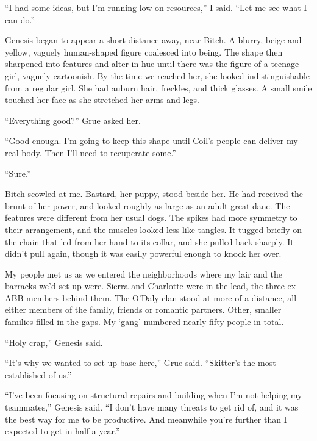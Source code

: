 ``I had some ideas, but I'm running low on resources,'' I said.  ``Let me see what I can do.''



Genesis began to appear a short distance away, near Bitch.  A blurry, beige and yellow, vaguely human-shaped figure coalesced into being.  The shape then sharpened into features and alter in hue until there was the figure of a teenage girl, vaguely cartoonish.  By the time we reached her, she looked indistinguishable from a regular girl.  She had auburn hair, freckles, and thick glasses.  A small smile touched her face as she stretched her arms and legs.



``Everything good?'' Grue asked her.



``Good enough.  I'm going to keep this shape until Coil's people can deliver my real body.  Then I'll need to recuperate some.''



``Sure.''



Bitch scowled at me.  Bastard, her puppy, stood beside her.  He had received the brunt of her power, and looked roughly as large as an adult great dane.  The features were different from her usual dogs.  The spikes had more symmetry to their arrangement, and the muscles looked less like tangles.  It tugged briefly on the chain that led from her hand to its collar, and she pulled back sharply.  It didn't pull again, though it was easily powerful enough to knock her over.



My people met us as we entered the neighborhoods where my lair and the barracks we'd set up were.  Sierra and Charlotte were in the lead, the three ex-ABB members behind them.  The O'Daly clan stood at more of a distance, all either members of the family, friends or romantic partners.  Other, smaller families filled in the gaps.  My `gang' numbered nearly fifty people in total.



``Holy crap,'' Genesis said.



``It's why we wanted to set up base here,''  Grue said.  ``Skitter's the most established of us.''



``I've been focusing on structural repairs and building when I'm not helping my teammates,'' Genesis said.  ``I don't have many threats to get rid of, and it was the best way for me to be productive.  And meanwhile you're further than I expected to get in half a year.''



